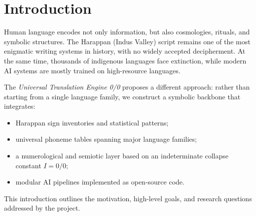\section{Introduction}
\label{sec:introduction}

Human language encodes not only information, but also cosmologies,
rituals, and symbolic structures. The Harappan (Indus Valley) script
remains one of the most enigmatic writing systems in history, with
no widely accepted decipherment. At the same time, thousands of
indigenous languages face extinction, while modern AI systems are
mostly trained on high-resource languages.

The \emph{Universal Translation Engine 0/0} proposes a different
approach: rather than starting from a single language family, we
construct a symbolic backbone that integrates:

\begin{itemize}
  \item Harappan sign inventories and statistical patterns;
  \item universal phoneme tables spanning major language families;
  \item a numerological and semiotic layer based on an
        indeterminate collapse constant $I = 0/0$;
  \item modular AI pipelines implemented as open-source code.
\end{itemize}

This introduction outlines the motivation, high-level goals, and
research questions addressed by the project.
